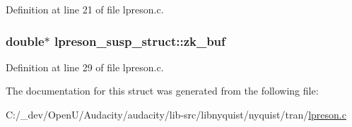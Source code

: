 Definition at line 21 of file lpreson.\+c.

\subsubsection[{\texorpdfstring{zk\+\_\+buf}{zk_buf}}]{\setlength{\rightskip}{0pt plus 5cm}double$\ast$ lpreson\+\_\+susp\+\_\+struct\+::zk\+\_\+buf}\hypertarget{structlpreson__susp__struct_ad19141e13fcfb6d01416846814776247}{}\label{structlpreson__susp__struct_ad19141e13fcfb6d01416846814776247}


Definition at line 29 of file lpreson.\+c.



The documentation for this struct was generated from the following file\+:\begin{DoxyCompactItemize}
\item 
C\+:/\+\_\+dev/\+Open\+U/\+Audacity/audacity/lib-\/src/libnyquist/nyquist/tran/\hyperlink{lpreson_8c}{lpreson.\+c}\end{DoxyCompactItemize}
